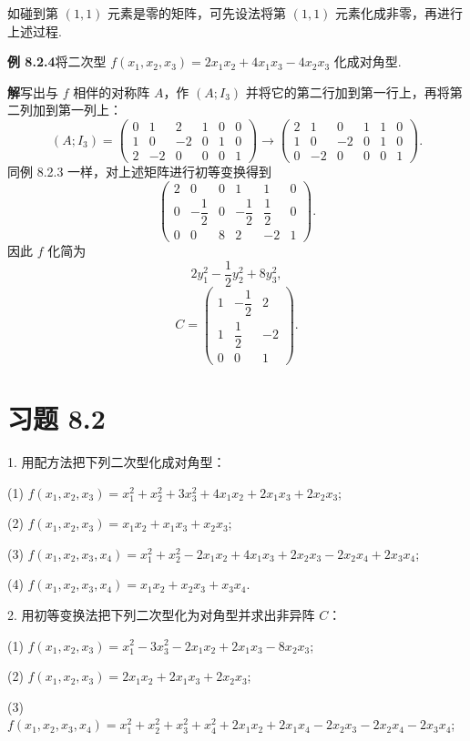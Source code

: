 \documentclass[UTF8,12pt,a4paper,fontset=fandol]{ctexart}
\begin{document}
如碰到第 $(1,1)$ 元素是零的矩阵，可先设法将第 $(1,1)$ 元素化成非零，再进行上述过程.

\noindent\textbf{例 8.2.4}\quad 将二次型 $f(x_1,x_2,x_3)=2x_1x_2+4x_1x_3-4x_2x_3$ 化成对角型.

\noindent\textbf{解}\quad 写出与 $f$ 相伴的对称阵 $A$，作 $(A;I_3)$ 并将它的第二行加到第一行上，再将第二列加到第一列上：
\[
(A;I_3)=
\left(\begin{array}{ccc|ccc}
0&1&2&1&0&0\\
1&0&-2&0&1&0\\
2&-2&0&0&0&1
\end{array}\right)
\rightarrow
\left(\begin{array}{ccc|ccc}
2&1&0&1&1&0\\
1&0&-2&0&1&0\\
0&-2&0&0&0&1
\end{array}\right).
\]
同例 8.2.3 一样，对上述矩阵进行初等变换得到
\[
\left(\begin{array}{ccc|ccc}
2&0&0&1&1&0\\
0&-\dfrac12&0&-\dfrac12&\dfrac12&0\\
0&0&8&2&-2&1
\end{array}\right).
\]
因此 $f$ 化简为
\[
2y_1^2-\frac12y_2^2+8y_3^2,
\]
\[
C=\left(\begin{array}{ccc}
1&-\dfrac12&2\\
1&\dfrac12&-2\\
0&0&1
\end{array}\right).
\]

\section*{习题 8.2}

1. 用配方法把下列二次型化成对角型：

(1) $f(x_1,x_2,x_3)=x_1^2+x_2^2+3x_3^2+4x_1x_2+2x_1x_3+2x_2x_3$;

(2) $f(x_1,x_2,x_3)=x_1x_2+x_1x_3+x_2x_3$;

(3) $f(x_1,x_2,x_3,x_4)=x_1^2+x_2^2-2x_1x_2+4x_1x_3+2x_2x_3-2x_2x_4+2x_3x_4$;

(4) $f(x_1,x_2,x_3,x_4)=x_1x_2+x_2x_3+x_3x_4$.

2. 用初等变换法把下列二次型化为对角型并求出非异阵 $C$：

(1) $f(x_1,x_2,x_3)=x_1^2-3x_3^2-2x_1x_2+2x_1x_3-8x_2x_3$;

(2) $f(x_1,x_2,x_3)=2x_1x_2+2x_1x_3+2x_2x_3$;

(3) $f(x_1,x_2,x_3,x_4)=x_1^2+x_2^2+x_3^2+x_4^2+2x_1x_2+2x_1x_4-2x_2x_3-2x_2x_4-2x_3x_4$;
\end{document}
